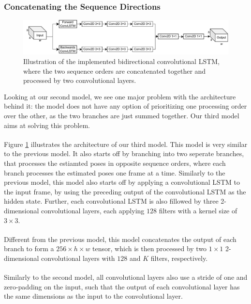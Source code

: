 \documentclass[./main.tex]{subfiles}
\begin{document}
\subsubsection{Concatenating the Sequence Directions}
\begin{figure}[htbp]
    \centering
    \includegraphics[width=\textwidth]{./entities/unipose2.pdf}
    \caption{Illustration of the implemented bidirectional convolutional LSTM, where the two sequence orders are concatenated together and processed by two convolutional layers.}
    \label{fig:unipose2}
\end{figure}

\noindent Looking at our second model, we see one major problem with the architecture behind it: the model does not have any option of prioritizing one processing order over the other, as the two branches are just summed together. Our third model aims at solving this problem.
\\
\\
Figure \ref{fig:unipose2} illustrates the architecture of our third model. This model is very similar to the previous model. It also starts off by branching into two seperate branches, that processes the estiamted poses in opposite sequence orders, where each branch processes the estimated poses one frame at a time. Similarly to the previous model, this model also starts off by applying a convolutional LSTM to the input frame, by using the preceding output of the convolutional LSTM as the hidden state. Further, each convolutional LSTM is also fillowed by three 2-dimensional convolutional layers, each applying $128$ filters with a kernel size of $3 \times 3$. 
\\
\\
Different from the previous model, this model concatenates the output of each branch to form a $256 \times h \times w$ tensor, which is then processed by two $1 \times 1$ 2-dimensional convolutional layers with $128$ and $K$ filters, respectively.
\\
\\
Similarly to the second model, all convolutional layers also use a stride of one and zero-padding on the input, such that the output of each convolutional layer has the same dimensions as the input to the convolutional layer.
\end{document}
